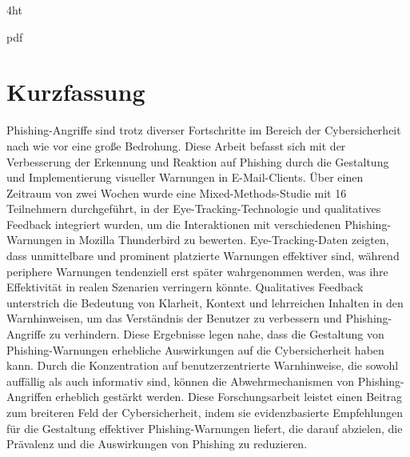\documentclass[
  a4paper,  %
  twoside,  %
  bibliography=totoc,
  headsepline,
  cleardoublepage=empty,
  parskip=half,
  draft=false
]{scrbook}
\begin{document}
\iftex4ht
  \Configure{}{\PicMath}{\EndPicMath}{}

  {pdf}
  {%
  }
\fi



\Coverpage
\Copyright
\pagestyle{preamble}
\renewcommand*{\chapterpagestyle}{preamble}



\section*{Kurzfassung}
Phishing-Angriffe sind trotz diverser Fortschritte im Bereich der Cybersicherheit nach wie vor eine große Bedrohung. Diese Arbeit befasst sich mit der Verbesserung der Erkennung und Reaktion auf Phishing durch die Gestaltung und Implementierung visueller Warnungen in E-Mail-Clients. Über einen Zeitraum von zwei Wochen wurde eine Mixed-Methods-Studie mit 16 Teilnehmern durchgeführt, in der Eye-Tracking-Technologie und qualitatives Feedback integriert wurden, um die Interaktionen mit verschiedenen Phishing-Warnungen in Mozilla Thunderbird zu bewerten. \newline
Eye-Tracking-Daten zeigten, dass unmittelbare und prominent platzierte Warnungen effektiver sind, während periphere Warnungen tendenziell erst später wahrgenommen werden, was ihre Effektivität in realen Szenarien verringern könnte. Qualitatives Feedback unterstrich die Bedeutung von Klarheit, Kontext und lehrreichen Inhalten in den Warnhinweisen, um das Verständnis der Benutzer zu verbessern und Phishing-Angriffe zu verhindern. \newline
Diese Ergebnisse legen nahe, dass die Gestaltung von Phishing-Warnungen erhebliche Auswirkungen auf die Cybersicherheit haben kann. Durch die Konzentration auf benutzerzentrierte Warnhinweise, die sowohl auffällig als auch informativ sind, können die Abwehrmechanismen von Phishing-Angriffen erheblich gestärkt werden. Diese Forschungsarbeit leistet einen Beitrag zum breiteren Feld der Cybersicherheit, indem sie evidenzbasierte Empfehlungen für die Gestaltung effektiver Phishing-Warnungen liefert, die darauf abzielen, die Prävalenz und die Auswirkungen von Phishing zu reduzieren. 
\end{document}
